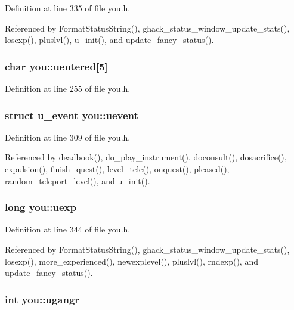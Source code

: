 Definition at line 335 of file you.\+h.



Referenced by Format\+Status\+String(), ghack\+\_\+status\+\_\+window\+\_\+update\+\_\+stats(), losexp(), pluslvl(), u\+\_\+init(), and update\+\_\+fancy\+\_\+status().

\hypertarget{structyou_a21d26a5db81fedeac63de8b7f5205151}{
\subsubsection[{uentered}]{\setlength{\rightskip}{0pt plus 5cm}char you\+::uentered\mbox{[}5\mbox{]}}}\label{structyou_a21d26a5db81fedeac63de8b7f5205151}


Definition at line 255 of file you.\+h.

\hypertarget{structyou_aaa426b9f3053502028edbe45d2031208}{
\subsubsection[{uevent}]{\setlength{\rightskip}{0pt plus 5cm}struct {\bf u\+\_\+event} you\+::uevent}}\label{structyou_aaa426b9f3053502028edbe45d2031208}


Definition at line 309 of file you.\+h.



Referenced by deadbook(), do\+\_\+play\+\_\+instrument(), doconsult(), dosacrifice(), expulsion(), finish\+\_\+quest(), level\+\_\+tele(), onquest(), pleased(), random\+\_\+teleport\+\_\+level(), and u\+\_\+init().

\hypertarget{structyou_a3a113c432a2a47b28f746f9455907487}{
\subsubsection[{uexp}]{\setlength{\rightskip}{0pt plus 5cm}long you\+::uexp}}\label{structyou_a3a113c432a2a47b28f746f9455907487}


Definition at line 344 of file you.\+h.



Referenced by Format\+Status\+String(), ghack\+\_\+status\+\_\+window\+\_\+update\+\_\+stats(), losexp(), more\+\_\+experienced(), newexplevel(), pluslvl(), rndexp(), and update\+\_\+fancy\+\_\+status().

\hypertarget{structyou_ace91478a77d9f0c0e8a8d44e33a0936a}{
\subsubsection[{ugangr}]{\setlength{\rightskip}{0pt plus 5cm}int you\+::ugangr}}\label{structyou_ace91478a77d9f0c0e8a8d44e33a0936a}



